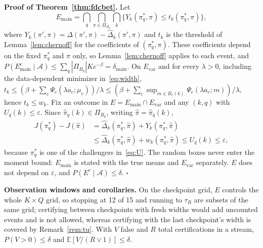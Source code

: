 \documentclass[sigconf,anonymous,review]{acmart}
\newcommand{\cA}{\mathcal{A}}
\newcommand{\eps}{\varepsilon}
\newcommand{\dmain}{\delta_{\text{main}}}
\begin{document}
\textbf{Proof of Theorem~\ref{thm:fdcbet}.} Let
\[
E_{\text{main}} = \textstyle\bigcap_{q}\bigcap_{\pi \in \Pi_{B_q}}\bigcap_{k}\{Y_k(\pi^*_q, \pi) \le t_k(\pi^*_q, \pi)\},
\] where $Y_k(\pi', \pi) = \Delta(\pi', \pi) - \hat\Delta_k(\pi', \pi)$ and $t_k$ is the threshold of Lemma~\ref{lem:chernoff} for the coefficients of $(\pi^*_q,\pi)$. These coefficients depend on the fixed $\pi^*_q$ and $\pi$ only, so Lemma~\ref{lem:chernoff} applies to each event, and $P(E_{\text{main}}^c \mid \cA) \le \sum_q |\Pi_{B_q}| K e^{-\beta} = \dmain$. On $E_{\text{var}}$ and for every $\lambda > 0$, including the data-dependent minimizer in~\eqref{eq:width}, $t_k \le (\beta + \sum_c \Psi_c(\lambda a_c;\mu_c))/\lambda \le (\beta + \sum_c \sup_{m \in B_c(k)}\Psi_c(\lambda a_c; m))/\lambda$, hence $t_k \le w_k$. Fix an outcome in $E = E_{\text{main}} \cap E_{\text{var}}$ and any $(k, q)$ with $U_q(k) \le \eps$. Since $\hat\pi_q(k) \in \Pi_{B_q}$, writing $\hat\pi = \hat\pi_q(k)$,
\[
\begin{aligned}
J(\pi^*_q) - J(\hat\pi) &= \hat\Delta_k(\pi^*_q, \hat\pi) + Y_k(\pi^*_q, \hat\pi)\\
&\le \hat\Delta_k(\pi^*_q, \hat\pi) + w_k(\pi^*_q, \hat\pi) \le U_q(k) \le \eps,
\end{aligned}
\]
because $\pi^*_q$ is one of the challengers in~\eqref{eq:U}. The random boxes never enter the moment bound: $E_{\text{main}}$ is stated with the true means and $E_{\text{var}}$ separately. $E$ does not depend on $\eps$, and $P(E^c \mid \cA) \le \delta$. $\square$

\textbf{Observation windows and corollaries.} On the checkpoint grid, $E$ controls the whole $K \times Q$ grid, so stopping at 12 of 15 and running to $\tau_R$ are subsets of the same grid; certifying between checkpoints with fresh widths would add uncounted events and is not allowed, whereas certifying with the last checkpoint's width is covered by Remark~\ref{rem:tu}. With $V$ false and $R$ total certifications in a stream, $P(V > 0) \le \delta$ and $\mathbb{E}[V/(R \vee 1)] \le \delta$.
\end{document}
